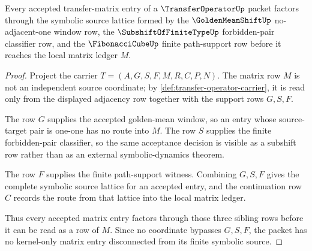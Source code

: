 \begin{theorem}
\label{thm:transfer-operator-symbolic-source-lattice}
Every accepted transfer-matrix entry of a $\TransferOperatorUp$ packet factors through the symbolic source lattice formed by the $\GoldenMeanShiftUp$ no-adjacent-one window row, the $\SubshiftOfFiniteTypeUp$ forbidden-pair classifier row, and the $\FibonacciCubeUp$ finite path-support row before it reaches the local matrix ledger $M$.
\end{theorem}
\begin{proof}
Project the carrier $T=(A,G,S,F,M,R,C,P,N)$. The matrix row $M$ is not an independent source coordinate; by \autoref{def:transfer-operator-carrier}, it is read only from the displayed adjacency row together with the support rows $G,S,F$.

The row $G$ supplies the accepted golden-mean window, so an entry whose source-target pair is one-one has no route into $M$. The row $S$ supplies the finite forbidden-pair classifier, so the same acceptance decision is visible as a subshift row rather than as an external symbolic-dynamics theorem.

The row $F$ supplies the finite path-support witness. Combining $G,S,F$ gives the complete symbolic source lattice for an accepted entry, and the continuation row $C$ records the route from that lattice into the local matrix ledger.

Thus every accepted matrix entry factors through those three sibling rows before it can be read as a row of $M$. Since no coordinate bypasses $G,S,F$, the packet has no kernel-only matrix entry disconnected from its finite symbolic source.
\end{proof}

